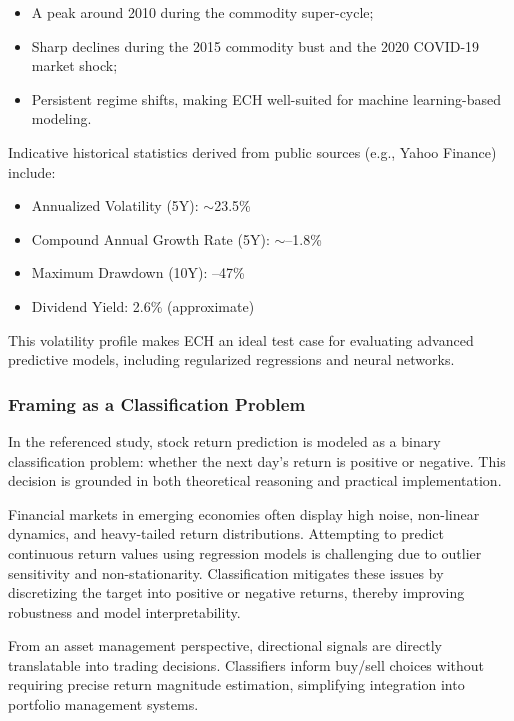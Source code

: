 \begin{itemize}
    \item A peak around 2010 during the commodity super-cycle;
    \item Sharp declines during the 2015 commodity bust and the 2020 COVID-19 market shock;
    \item Persistent regime shifts, making ECH well-suited for machine learning-based modeling.
\end{itemize}

Indicative historical statistics derived from public sources (e.g., Yahoo Finance) include:
\begin{itemize}
    \item Annualized Volatility (5Y): $\sim$23.5\%
    \item Compound Annual Growth Rate (5Y): $\sim$--1.8\%
    \item Maximum Drawdown (10Y): --47\%
    \item Dividend Yield: 2.6\% (approximate)
\end{itemize}

This volatility profile makes ECH an ideal test case for evaluating advanced predictive models, including regularized regressions and neural networks.

\subsubsection{Framing as a Classification Problem}

In the referenced study, stock return prediction is modeled as a binary classification problem: whether the next day's return is positive or negative. This decision is grounded in both theoretical reasoning and practical implementation.

Financial markets in emerging economies often display high noise, non-linear dynamics, and heavy-tailed return distributions. Attempting to predict continuous return values using regression models is challenging due to outlier sensitivity and non-stationarity. Classification mitigates these issues by discretizing the target into positive or negative returns, thereby improving robustness and model interpretability.

From an asset management perspective, directional signals are directly translatable into trading decisions. Classifiers inform buy/sell choices without requiring precise return magnitude estimation, simplifying integration into portfolio management systems.

